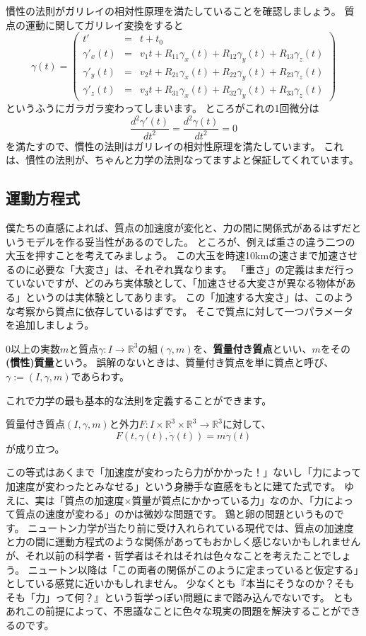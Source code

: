 慣性の法則がガリレイの相対性原理を満たしていることを確認しましょう。
質点の運動に関してガリレイ変換をすると
\[
  \gamma(t)=\begin{pmatrix}
    t'&=&t+t_0\\
    \gamma'_x(t)&=&v_1t+R_{11}\gamma_x(t)+R_{12}\gamma_y(t)+R_{13}\gamma_z(t)\\
    \gamma'_y(t)&=&v_2t+R_{21}\gamma_x(t)+R_{22}\gamma_y(t)+R_{23}\gamma_z(t)\\
    \gamma'_z(t)&=&v_3t+R_{31}\gamma_x(t)+R_{32}\gamma_y(t)+R_{33}\gamma_z(t)
  \end{pmatrix}
\]
というふうにガラガラ変わってしまいます。
ところがこれの1回微分は
\[
  \frac{d^2\gamma'(t)}{dt^2}=\frac{d^2\gamma(t)}{dt^2}=0
\]
を満たすので、慣性の法則はガリレイの相対性原理を満たしています。
これは、慣性の法則が、ちゃんと力学の法則なってますよと保証してくれています。

\subsection{運動方程式}

僕たちの直感によれば、質点の加速度が変化と、力の間に関係式があるはずだというモデルを作る妥当性があるのでした。
ところが、例えば重さの違う二つの大玉を押すことを考えてみましょう。
この大玉を時速10kmの速さまで加速させるのに必要な「大変さ」は、それぞれ異なります。
「重さ」の定義はまだ行っていないですが、どのみち実体験として、「加速させる大変さが異なる物体がある」というのは実体験としてあります。
この「加速する大変さ」は、このような考察から質点に依存しているはずです。
そこで質点に対して一つパラメータを追加しましょう。

\begin{definition}[慣性質量]
  0以上の実数$m$と質点$\gamma:I\to\mathbb{R}^3$の組$(\gamma,m)$を、\textbf{質量付き質点}といい、$m$をその\textbf{(慣性)質量}という。
  誤解のないときは、質量付き質点を単に質点と呼び、$\gamma:=(I,\gamma,m)$であらわす。
\end{definition}

これで力学の最も基本的な法則を定義することができます。
\begin{definition}[運動方程式]
  質量付き質点$(I,\gamma,m)$と外力$F:I\times\mathbb{R}^3\times\mathbb{R}^3\to\mathbb{R}^3$に対して、
  \[
    F(t,\gamma(t),\dot\gamma(t))=m\ddot\gamma(t)
  \]
  が成り立つ。
\end{definition}

この等式はあくまで「加速度が変わったら力がかかった！」ないし「力によって加速度が変わったとみなせる」という身勝手な直感をもとに建てた式です。
ゆえに、実は「質点の加速度×質量が質点にかかっている力」なのか、「力によって質点の速度が変わる」のかは微妙な問題です。
鶏と卵の問題というものです。
ニュートン力学が当たり前に受け入れられている現代では、質点の加速度と力の間に運動方程式のような関係があってもおかしく感じないかもしれませんが、それ以前の科学者・哲学者はそれはそれは色々なことを考えたことでしょう。
ニュートン以降は「この両者の関係がこのように定まっていると仮定する」としている感覚に近いかもしれません。
少なくとも『本当にそうなのか？そもそも「力」って何？』という哲学っぽい問題にまで踏み込んでないです。
ともあれこの前提によって、不思議なことに色々な現実の問題を解決することができるのです。

